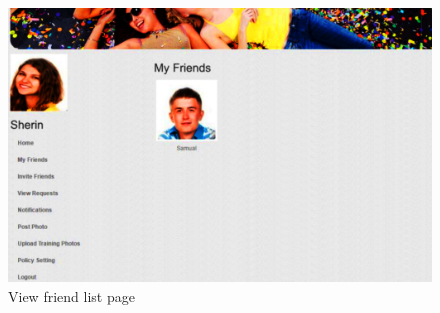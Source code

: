 \begin{figure}[H]
\begin{minipage}[c]{1\linewidth}
\begin{center}
 \includegraphics[width=\textwidth]{sherinsfriend.png}
            \caption[View Friend List Page]{View friend list page}
             \label{Friend list}
\end{center}
 \end{minipage}          
\end{figure}
\clearpage
